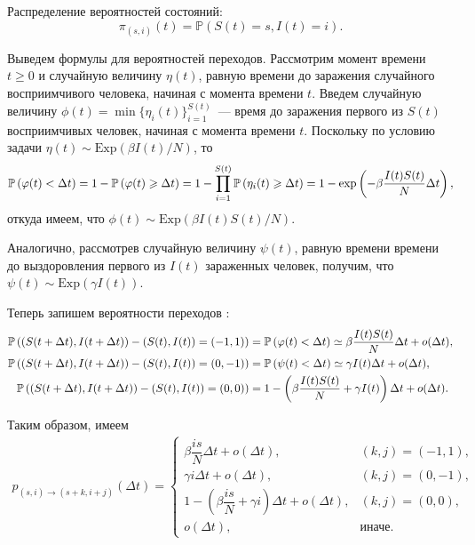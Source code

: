 \documentclass[12pt]{article}
\begin{document}
Распределение вероятностей состояний:
\[ \pi_{(s, i)}(t) = \mathbb{P} \left( S(t) = s, I(t) = i \right). \]

Выведем формулы для вероятностей переходов. Рассмотрим момент времени $t \geqslant 0$ и случайную величину $\eta(t)$, равную времени до заражения случайного восприимчивого человека, начиная с момента времени $t$. Введем случайную величину $\phi(t) = \min\{ \eta_i(t) \}_{i=1}^{S(t)}$~--- время до заражения первого из $S(t)$ восприимчивых человек, начиная с момента времени $t$. Поскольку по условию задачи $\eta(t) \sim \mathrm{Exp}(\beta I(t) / N)$, то
\[ \mathbb{P}\left(\varphi(t) < \Delta t\right) = 1 - \mathbb{P}\left(\varphi(t) \geqslant \Delta t\right) = 1 - \prod_{i=1}^{S(t)} \mathbb{P}\left(\eta_i(t) \geqslant \Delta t\right) = 1 - \exp\left( - \beta \dfrac{I(t)S(t)}{N} \Delta t \right), \]
откуда имеем, что $\phi(t) \sim \mathrm{Exp}\left( \beta I(t) S(t) / N \right)$.

Аналогично, рассмотрев случайную величину $\psi(t)$, равную времени времени до выздоровления первого из $I(t)$ зараженных человек, получим, что $\psi(t) \sim \mathrm{Exp}\left( \gamma I(t) \right)$.

Теперь запишем вероятности переходов \cite{Greenwood2009}:
\begin{align*}
    \mathbb{P}\left(\left(S(t + \Delta t), I(t + \Delta t)\right) - \left(S(t), I(t)\right) = \left(-1, 1\right)\right) &= \mathbb{P}\left(\varphi(t) < \Delta t\right) \simeq \beta \dfrac{I(t)S(t)}{N} \Delta t + o(\Delta t), \\
    \mathbb{P}\left(\left(S(t + \Delta t), I(t + \Delta t)\right) - \left(S(t), I(t)\right) = \left(0, -1\right)\right) &= \mathbb{P}\left(\psi(t) < \Delta t\right) \simeq \gamma I(t) \Delta t + o(\Delta t), \\
    \mathbb{P}\left(\left(S(t + \Delta t), I(t + \Delta t)\right) - \left(S(t), I(t)\right) = \left(0, 0\right)\right) &= 1 - \left(\beta \dfrac{I(t)S(t)}{N} + \gamma I(t) \right)\Delta t + o(\Delta t).
\end{align*}

Таким образом, имеем
\begin{align*}
    p_{(s, i) \to (s+k, i+j)}(\Delta t) = 
    \begin{cases}
        \beta \dfrac{is}{N} \Delta t + o(\Delta t), & (k, j) = (-1, 1), \\
        \gamma i \Delta t + o(\Delta t), & (k, j) = (0, -1), \\
        1 - \left(\beta \dfrac{is}{N} + \gamma i \right)\Delta t + o(\Delta t), & (k, j) = (0, 0), \\
        o(\Delta t), & \text{иначе}.
    \end{cases}
\end{align*}
\end{document}
